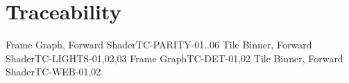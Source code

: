 \documentclass[11pt]{article}
\begin{document}
\section{Traceability}

\begin{traceability}
        {Frame Graph, Forward Shader}{TC-PARITY-{01..06}}
        {Tile Binner, Forward Shader}{TC-LIGHTS-{01,02,03}}
        {Frame Graph}{TC-DET-{01,02}}
        {Tile Binner, Forward Shader}{TC-WEB-{01,02}}
\end{traceability}
\end{document}
